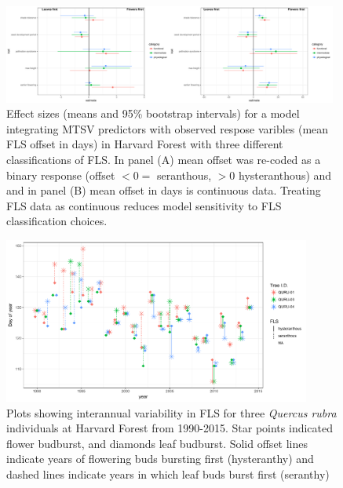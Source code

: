 \documentclass[12pt]{article}\usepackage[]{graphicx}\usepackage[]{color}
\begin{document}
\begin{center}
\begin{figure}[here]
\includegraphics[width=0.98\textwidth]{..//figures/HF_con_v_bin_comp.pdf} %
\caption{Effect sizes (means and 95\% bootstrap intervals) for a model integrating MTSV predictors with observed respose varibles (mean FLS offset in days) in Harvard Forest with three different classifications of FLS. In panel (A) mean offset was re-coded as a binary response (offset $<0 =$ seranthous, $>0$ hysteranthous) and and in panel (B) mean offset in days is continuous data. Treating FLS data as continuous reduces model sensitivity to FLS classification choices.}
\label{fig:Figure 2}
\end{figure}

\end{center}
\begin{center}
\begin{figure}[here]
\includegraphics[width=0.9\textwidth]{..//figures/HF_dissplot.pdf} %
\caption{Plots showing interannual variability in FLS for three \textit{Quercus rubra} individuals at Harvard Forest from 1990-2015. Star points indicated flower budburst, and diamonds leaf budburst. Solid offset lines indicate years of flowering buds bursting first (hysteranthy) and dashed lines indicate years in which leaf buds burst first (seranthy)}
\label{fig:Figure 3}
\end{figure}
\end{center}
\end{document}
